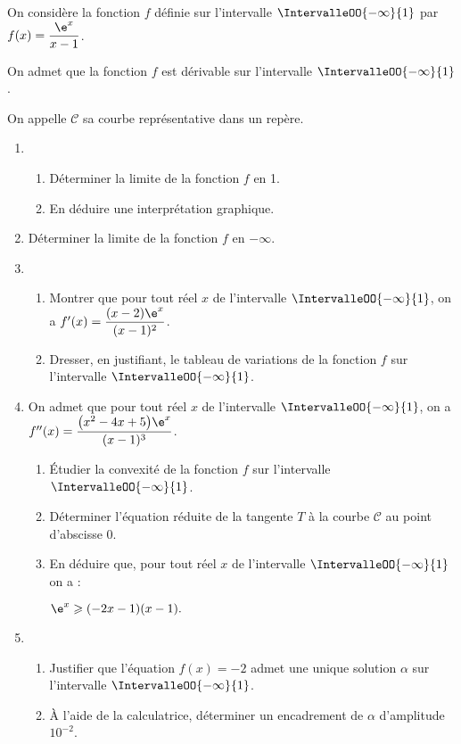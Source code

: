 On considère la fonction $f$ définie sur l’intervalle $\IntervalleOO{-\infty}{1}$ par $f(x)=\dfrac{\e^x}{x-1}$.

On admet que la fonction $f$ est dérivable sur l’intervalle $\IntervalleOO{-\infty}{1}$.

On appelle $\mathcal{C}$ sa courbe représentative dans un repère.

\begin{enumerate}%
	\item 
	\begin{enumerate}
		\item Déterminer la limite de la fonction $f$ en 1.
		\item En déduire une interprétation graphique.
	\end{enumerate}
	\item Déterminer la limite de la fonction $f$ en $-\infty$.
	\item 
	\begin{enumerate}
		\item Montrer que pour tout réel $x$ de l’intervalle $\IntervalleOO{-\infty}{1}$, on a $f'(x)=\dfrac{(x-2)\e^x}{(x-1)^2}$.
		\item Dresser, en justifiant, le tableau de variations de la fonction $f$ sur
		l’intervalle $\IntervalleOO{-\infty}{1}$.
	\end{enumerate}
	\item On admet que pour tout réel $x$ de l’intervalle $\IntervalleOO{-\infty}{1}$, on a $f''(x)=\dfrac{\big(x^2-4x+5\big)\e^x}{(x-1)^3}$.
	\begin{enumerate}
		\item Étudier la convexité de la fonction $f$ sur l’intervalle $\IntervalleOO{-\infty}{1}$.
		\item Déterminer l’équation réduite de la tangente $T$ à la courbe $\mathcal{C}$ au point d’abscisse 0.
		\item En déduire que, pour tout réel $x$ de l’intervalle $\IntervalleOO{-\infty}{1}$ on a :
		\begin{Centrage}
			$\e^x \geqslant (-2x-1)(x-1).$
		\end{Centrage}
	\end{enumerate}
	\item 
	\begin{enumerate}
		\item Justifier que l’équation $f(x)=-2$ admet une unique solution $\alpha$ sur l’intervalle $\IntervalleOO{-\infty}{1}$.
		\item À l’aide de la calculatrice, déterminer un encadrement de $\alpha$ d’amplitude $10^{-2}$.
	\end{enumerate}
\end{enumerate}